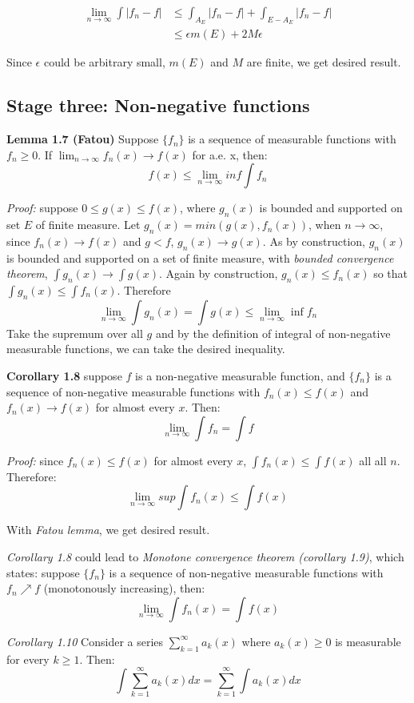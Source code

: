 \documentclass[
]{article}
\begin{document}
\[
  \begin{split}
    \lim_{n\to\infty}\int |f_n-f|&\leq \int_{A_E}|f_n-f|+\int_{E-A_E}|f_n-f|\\
    &\leq \epsilon m(E) + 2M\epsilon 
  \end{split}
\]

Since \(\epsilon\) could be arbitrary small, \(m(E)\) and \(M\) are finite, we get desired result.

\subsection{Stage three: Non-negative functions}
\textbf{Lemma 1.7 (Fatou)} Suppose \(\{f_n\}\) is a sequence of measurable functions with \(f_n \geq 0\). If 
\(\lim_{n\to\infty}f_n(x)\to f(x)\) for a.e. x, then:
\[f(x)\leq \lim_{n\to\infty}inf\int f_n\]

\textit{Proof:} suppose \(0\leq g(x) \leq f(x)\), where \(g_n(x)\) is bounded and supported on set \(E\)
of finite measure. Let \(g_n(x)=min(g(x), f_n(x))\), when \(n\to\infty\), since \(f_n(x)\to f(x)\) and \(g<f\),
\(g_n(x)\to g(x)\). As by construction, \(g_n(x)\) is bounded and supported on a set of finite measure, with \textit{bounded convergence theorem},
\(\int g_n(x)\to \int g(x)\). Again by construction, \(g_n(x)\leq f_n(x)\) so that \(\int g_n(x) \leq \int f_n(x)\). Therefore
\[
  \lim_{n\to\infty}\int g_n(x)=\int g(x) \leq \lim_{n\to\infty}\inf f_n
\]
Take the supremum over all \(g\) and by the definition of integral of non-negative measurable functions,
we can take the desired inequality.

\textbf{Corollary 1.8} suppose \(f\) is a non-negative measurable function, and \(\{f_n\}\) is a sequence
of non-negative measurable functions with \(f_n(x)\leq f(x)\) and \(f_n(x)\to f(x)\) for almost every \(x\). Then:
\[\lim_{n\to\infty}\int f_n = \int f\]

\textit{Proof:} since \(f_n(x)\leq f(x)\) for almost every \(x\), \(\int f_n(x)\leq \int f(x)\) all all \(n\). Therefore:
\[\lim_{n\to\infty}sup\int f_n(x)\leq\int f(x)\]

With \textit{Fatou lemma}, we get desired result.

\textit{Corollary 1.8} could lead to \textit{Monotone convergence theorem (corollary 1.9)}, which states: suppose
\(\{f_n\}\) is a sequence of non-negative measurable functions with \(f_n\nearrow f \) (monotonously increasing), then:
\[\lim_{n\to\infty}\int f_n(x)=\int f(x)\]

\textit{Corollary 1.10} Consider a series \(\sum_{k=1}^{\infty}a_k(x)\) where \(a_k(x) \geq 0\) is measurable for every \(k \geq 1\). Then:
\[\int \sum_{k=1}^{\infty}a_k(x)dx=\sum_{k=1}^{\infty}\int a_k(x)dx\]
\end{document}
